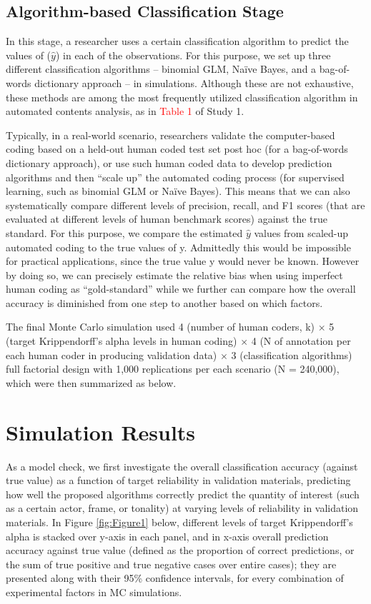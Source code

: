 \documentclass[man, 12pt, a4paper, nolmodern, noextraspace]{apa6}
\begin{document}
    \subsection{Algorithm-based Classification Stage}
    
    In this stage, a researcher uses a certain classification algorithm to predict the values of ($\hat{y}$) in each of the observations. For this purpose, we set up three different classification algorithms – binomial GLM, Naïve Bayes, and a bag-of-words dictionary approach -- in simulations. Although these are not exhaustive, these methods are among the most frequently utilized classification algorithm in automated contents analysis, as in \textcolor{red}{Table 1} of Study 1. 
    
    Typically, in a real-world scenario, researchers validate the computer-based coding based on a held-out human coded test set post hoc (for a bag-of-words dictionary approach), or use such human coded data to develop prediction algorithms and then ``scale up'' the automated coding process (for supervised learning, such as binomial GLM or Naïve Bayes). This means that we can also systematically compare different levels of precision, recall, and F1 scores (that are evaluated at different levels of human benchmark scores) against the true standard. For this purpose, we compare the estimated $\hat{y}$ values from scaled-up automated coding to the true values of y. Admittedly this would be impossible for practical applications, since the true value y would never be known. However by doing so, we can precisely estimate the relative bias when using imperfect human coding as \enquote{gold-standard} while we further can compare how the overall accuracy is diminished from one step to another based on which factors. 
    
    The final Monte Carlo simulation used 4 (number of human coders, k) $\times$ 5 (target Krippendorff's alpha levels in human coding) $\times$ 4 (N of annotation per each human coder in producing validation data) $\times$ 3 (classification algorithms) full factorial design with 1,000 replications per each scenario (N = 240,000), which were then summarized as below.
    
\section{Simulation Results}

As a model check, we first investigate the overall classification accuracy (against true value) as a function of target reliability in validation materials, predicting how well the proposed algorithms correctly predict the quantity of interest (such as a certain actor, frame, or tonality) at varying levels of reliability in validation materials. In Figure \ref{fig:Figure1} below, different levels of target Krippendorff's alpha is stacked over y-axis in each panel, and in x-axis overall prediction accuracy against true value (defined as the proportion of correct predictions, or the sum of true positive and true negative cases over entire cases); they are presented along with their 95\% confidence intervals, for every combination of experimental factors in MC simulations.
\end{document}
